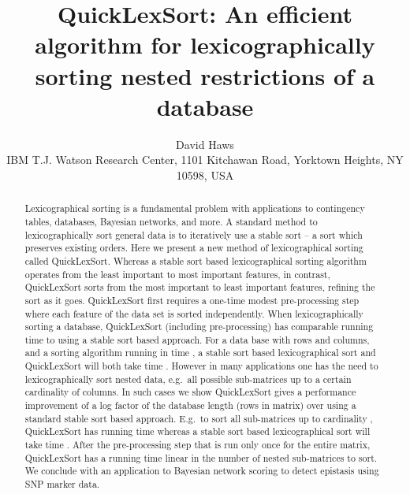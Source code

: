 \documentclass[a4paper,10pt,reqno]{amsart}
\title[QuickLexSort]{QuickLexSort: An efficient algorithm for lexicographically sorting nested restrictions of a database}
\author[]{David Haws\\IBM T.J. Watson Research Center, 1101 Kitchawan Road, Yorktown Heights, NY 10598, USA}
\date{}
\theoremstyle{definition}
\begin{document}
\begin{abstract}
Lexicographical sorting is a fundamental problem with applications to
contingency tables, databases, Bayesian networks, and more. A standard method
to lexicographically sort general data is to iteratively use a stable sort -- a
sort which preserves existing orders. Here we present a new method of
lexicographical sorting called QuickLexSort.  Whereas a stable sort based
lexicographical sorting algorithm operates from the least important to most
important features, in contrast, QuickLexSort sorts from the most important to
least important features, refining the sort as it goes.  QuickLexSort first
requires a one-time modest pre-processing step where each feature of the data set is
sorted independently.  When lexicographically sorting a database, QuickLexSort
(including pre-processing) has comparable running time to using a stable sort
based approach.  For a data base with  rows and  columns, and a sorting
algorithm running in time , a stable sort based lexicographical
sort and QuickLexSort will both take time .  However in many
applications one has the need to lexicographically sort nested data, e.g.\ all
possible sub-matrices up to a certain cardinality of columns. In such cases we
show QuickLexSort gives a performance improvement of a log factor
of the database length (rows in matrix) over using a standard stable sort based
approach. E.g.\ to sort all sub-matrices up to cardinality , QuickLexSort
has running time  whereas a stable sort based lexicographical sort
will take time .  After the pre-processing step that is run only
once for the entire matrix, QuickLexSort has a running time linear in the
number of nested sub-matrices to sort. We conclude with an application to
Bayesian network scoring to detect epistasis using SNP marker data.

\end{abstract}

\maketitle
\footnotetext{\today}
\end{document}
